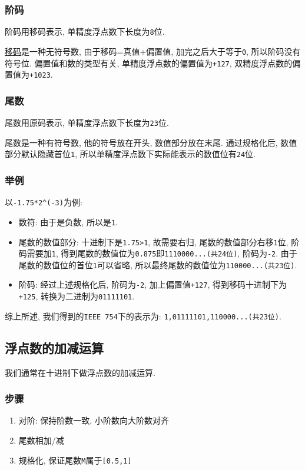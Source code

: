 \subsubsection{阶码}
阶码用移码表示, 单精度浮点数下长度为\verb|8|位. \par
\hyperref[移码]{移码}是一种无符号数, 由于移码=真值+偏置值, 加完之后大于等于\verb|0|, 所以阶码没有符号位. 偏置值和数的类型有关, 单精度浮点数的偏置值为\verb|+127|, 双精度浮点数的偏置值为\verb|+1023|.
\subsubsection{尾数}
尾数用原码表示, 单精度浮点数下长度为\verb|23|位. \par
尾数是一种有符号数, 他的符号放在开头, 数值部分放在末尾. 通过规格化后, 数值部分默认隐藏首位\verb|1|, 所以单精度浮点数下实际能表示的数值位有\verb|24|位.
\subsubsection{举例}
以\verb|-1.75*2^(-3)|为例: \par
\begin{itemize}
\item 数符: 由于是负数, 所以是\verb|1|. \par
\item 尾数的数值部分: 十进制下是\verb|1.75>1|, 故需要右归, 尾数的数值部分右移\verb|1|位, 阶码需要加\verb|1|, 得到尾数的数值位为\verb|0.875|即\verb|1110000...(共24位)|, 阶码为\verb|-2|. 由于尾数的数值位的首位\verb|1|可以省略, 所以最终尾数的数值位为\verb|110000...(共23位)|. \par
\item 阶码: 经过上述规格化后, 阶码为\verb|-2|, 加上偏置值\verb|+127|, 得到移码十进制下为\verb|+125|, 转换为二进制为\verb|01111101|. \par
\end{itemize}
综上所述, 我们得到的\verb|IEEE 754|下的表示为: \verb|1,01111101,110000...(共23位)|.
\subsection{浮点数的加减运算}
我们通常在十进制下做浮点数的加减运算.
\subsubsection{步骤}
\begin{enumerate}
\item 对阶: 保持阶数一致, 小阶数向大阶数对齐
\item 尾数相加/减
\item 规格化, 保证尾数\verb|M|属于\verb|[0.5,1]|
\end{enumerate}
